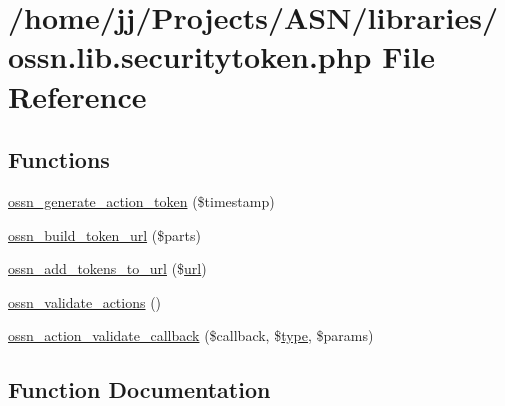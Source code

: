 \hypertarget{ossn_8lib_8securitytoken_8php}{}\section{/home/jj/\+Projects/\+A\+S\+N/libraries/ossn.lib.\+securitytoken.\+php File Reference}
\label{ossn_8lib_8securitytoken_8php}
\subsection*{Functions}
\begin{DoxyCompactItemize}
\item 
\hyperlink{ossn_8lib_8securitytoken_8php_a2a442e28fe67811329ef1319ebb035d0}{ossn\+\_\+generate\+\_\+action\+\_\+token} (\$timestamp)
\item 
\hyperlink{ossn_8lib_8securitytoken_8php_a561bc3c634cfba1272f0ecb5cb0ec9de}{ossn\+\_\+build\+\_\+token\+\_\+url} (\$parts)
\item 
\hyperlink{ossn_8lib_8securitytoken_8php_a2443079b50a74ef92704a4d9a89e294b}{ossn\+\_\+add\+\_\+tokens\+\_\+to\+\_\+url} (\$\hyperlink{ossn_8config_8site_8example_8php_ad643c3db2725019ef8130393d549e6db}{url})
\item 
\hyperlink{ossn_8lib_8securitytoken_8php_af2268fb80e90cb05db46778c84af6939}{ossn\+\_\+validate\+\_\+actions} ()
\item 
\hyperlink{ossn_8lib_8securitytoken_8php_acfb00d20c2fd5cf2ab7e7f1fb2f04f5f}{ossn\+\_\+action\+\_\+validate\+\_\+callback} (\$callback, \$\hyperlink{_ossn_wall_2actions_2wall_2post_2group_8php_a2dc1bb4e1ed0029daa81ac0776b14b51}{type}, \$params)
\end{DoxyCompactItemize}


\subsection{Function Documentation}
